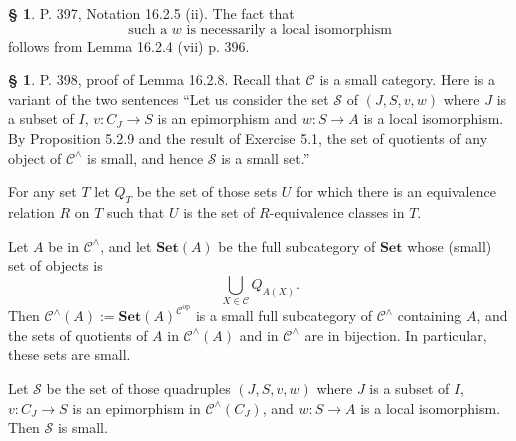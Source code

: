 \documentclass[12pt]{article}
\theoremstyle{remark}
\theoremstyle{definition}
\newtheorem{s}[thm]{\S}
\newcommand{\cc}{\mathcal}
\newcommand{\C}{\mathcal C}
\newcommand{\Set}{\mathbf{Set}}
\DeclareMathOperator{\op}{op}
\begin{document}
%
%
\begin{s} 
P. 397, Notation 16.2.5 (ii). The fact that 
\begin{equation}\label{1625}
\text{such a $w$ is necessarily a local isomorphism}
\end{equation}
follows from Lemma 16.2.4 (vii) p. 396.
\end{s}
%
%
\begin{s} 
P. 398, proof of Lemma 16.2.8. Recall that $\C$ is a small category. Here is a variant of the two sentences ``Let us consider the set $\cc S$ of $(J,S,v,w)$ where $J$ is a subset of $I$, $v:C_J\to S$ is an epimorphism and $w:S\to A$ is a local isomorphism. By Proposition 5.2.9 and the result of Exercise 5.1, the set of quotients of any object of $\C^\wedge$ is small, and hence $\cc S$ is a small set.'' 

For any set $T$ let $Q_T$ be the set of those sets $U$ for which there is an equivalence relation $R$ on $T$ such that $U$ is the set of $R$-equivalence classes in $T$. 

Let $A$ be in $\C^\wedge$, and let $\Set(A)$ be the full subcategory of $\Set$ whose (small) set of objects is 
$$
\bigcup_{X\in\C}Q_{A(X)}.
$$ 
Then $\C^\wedge(A):=\Set(A)^{\C^{\op}}$ is a small full subcategory of $\C^\wedge$ containing $A$, and the sets of quotients of $A$ in $\C^\wedge(A)$ and in $\C^\wedge$ are in bijection. In particular, these sets are small. 

Let $\cc S$ be the set of those quadruples $(J,S,v,w)$ where $J$ is a subset of $I$, $v:C_J\to S$ is an epimorphism in $\C^\wedge(C_J)$, and $w:S\to A$ is a local isomorphism. Then $\cc S$ is small.
\end{s}
%
%
\end{document}
